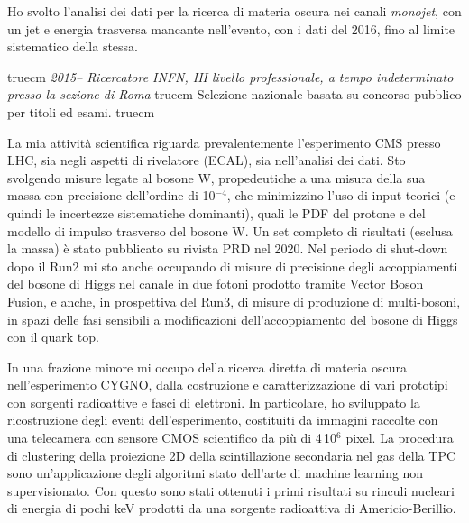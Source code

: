\documentclass[11pt,twoside,a4paper]{article}
\begin{document}
Ho svolto l'analisi dei dati per la ricerca di materia oscura nei
canali \textit{monojet}, con un jet e energia trasversa mancante
nell'evento, con i dati del 2016, fino al limite sistematico della
stessa.

 truecm
\textit{2015-- Ricercatore INFN, III livello professionale, a tempo indeterminato presso la sezione di Roma}
 truecm
Selezione nazionale basata su concorso pubblico per titoli ed esami.
 truecm

La mia attivit\`a scientifica riguarda prevalentemente l'esperimento
CMS presso LHC, sia negli aspetti di rivelatore (ECAL), sia
nell'analisi dei dati. Sto svolgendo misure legate al bosone W,
propedeutiche a una misura della sua massa con precisione dell'ordine
di 10$^{-4}$, che minimizzino l'uso di input teorici (e quindi le
incertezze sistematiche dominanti), quali le PDF del protone e del
modello di impulso trasverso del bosone W. Un set completo di
risultati (esclusa la massa) \`e stato pubblicato su rivista PRD nel
2020. Nel periodo di shut-down dopo il Run2 mi sto anche occupando di
misure di precisione degli accoppiamenti del bosone di Higgs nel
canale in due fotoni prodotto tramite Vector Boson Fusion, e anche, in
prospettiva del Run3, di misure di produzione di multi-bosoni, in
spazi delle fasi sensibili a modificazioni dell'accoppiamento del
bosone di Higgs con il quark top.

In una frazione minore mi occupo della ricerca diretta di materia
oscura nell'esperimento CYGNO, dalla costruzione e caratterizzazione
di vari prototipi con sorgenti radioattive e fasci di elettroni. In
particolare, ho sviluppato la ricostruzione degli eventi
dell'esperimento, costituiti da immagini raccolte con una telecamera
con sensore CMOS scientifico da pi\`u di 4\,10$^6$ pixel.  La
procedura di clustering della proiezione 2D della scintillazione
secondaria nel gas della TPC sono un'applicazione degli algoritmi
stato dell'arte di machine learning non supervisionato. Con questo
sono stati ottenuti i primi risultati su rinculi nucleari di energia
di pochi keV prodotti da una sorgente radioattiva di Americio-Berillio.
\end{document}
